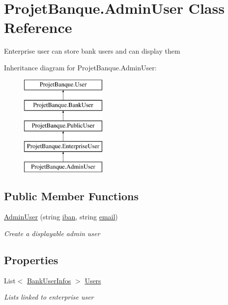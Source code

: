 \hypertarget{class_projet_banque_1_1_admin_user}{}\section{Projet\+Banque.\+Admin\+User Class Reference}
\label{class_projet_banque_1_1_admin_user}


Enterprise user can store bank users and can display them  


Inheritance diagram for Projet\+Banque.\+Admin\+User\+:\begin{figure}[H]
\begin{center}
\leavevmode
\includegraphics[height=5.000000cm]{class_projet_banque_1_1_admin_user}
\end{center}
\end{figure}
\subsection*{Public Member Functions}
\begin{DoxyCompactItemize}
\item 
\mbox{\hyperlink{class_projet_banque_1_1_admin_user_a1ab74cd3e86e062f55b3d860eb9c6356}{Admin\+User}} (string \mbox{\hyperlink{class_projet_banque_1_1_user_a52d4f7f22889d33e196357127ceb3ec3}{iban}}, string \mbox{\hyperlink{class_projet_banque_1_1_user_a7ee066f61ff3a59b05f003709548428a}{email}})
\begin{DoxyCompactList}\small\item\em Create a displayable admin user \end{DoxyCompactList}\end{DoxyCompactItemize}
\subsection*{Properties}
\begin{DoxyCompactItemize}
\item 
List$<$ \mbox{\hyperlink{class_projet_banque_1_1_bank_user_infos}{Bank\+User\+Infos}} $>$ \mbox{\hyperlink{class_projet_banque_1_1_admin_user_a120a08108f220e1900fb56a857f6daec}{Users}}
\begin{DoxyCompactList}\small\item\em Lists linked to enterprise user \end{DoxyCompactList}\end{DoxyCompactItemize}
